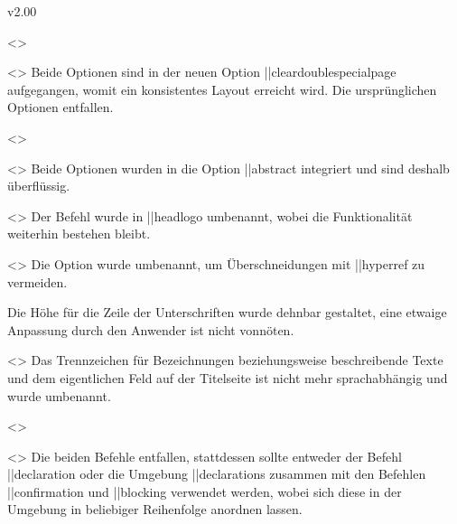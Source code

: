 \begin{Changes}{v2.00}
\begin{Obsolete}
  {}
  <>
\begin{Obsolete}
  {}
  <>
\printdeclarationlist
%
Beide Optionen sind in der neuen Option \Option||{cleardoublespecialpage} 
aufgegangen, womit ein konsistentes Layout erreicht wird. Die ursprünglichen 
Optionen entfallen. 
\end{Obsolete}
\end{Obsolete}

\begin{Obsolete}
  {}
  <>
\begin{Obsolete}
  {}
  <>
\printdeclarationlist
%
Beide Optionen wurden in die Option \Option||{abstract} integriert und sind 
deshalb überflüssig.
\end{Obsolete}
\end{Obsolete}

\begin{Obsolete}
  {}
  <>
\printdeclarationlist
%
Der Befehl wurde in \Macro||{headlogo} umbenannt, wobei die Funktionalität 
weiterhin bestehen bleibt.
\end{Obsolete}

\begin{Obsolete}
  {}
  <>
\printdeclarationlist
%
Die Option wurde umbenannt, um Überschneidungen mit \Package||{hyperref} zu 
vermeiden.
\end{Obsolete}

\begin{Obsolete}
  {}
\printdeclarationlist
%
Die Höhe für die Zeile der Unterschriften wurde dehnbar gestaltet, eine etwaige 
Anpassung durch den Anwender ist nicht vonnöten.
\end{Obsolete}

\begin{Obsolete}
  {}
  <>
\printdeclarationlist
%
Das Trennzeichen für Bezeichnungen beziehungsweise beschreibende Texte und dem 
eigentlichen Feld auf der Titelseite ist nicht mehr sprachabhängig und wurde 
umbenannt.
\end{Obsolete}

\begin{Obsolete}
  {}
  <>
\begin{Obsolete}
  {}
  <>
\printdeclarationlist
%
Die beiden Befehle entfallen, stattdessen sollte entweder der Befehl 
\Macro||{declaration} oder die Umgebung \Environment||{declarations} zusammen 
mit den Befehlen \Macro||{confirmation} und \Macro||{blocking} verwendet 
werden, wobei sich diese in der Umgebung in beliebiger Reihenfolge anordnen 
lassen.
\end{Obsolete}
\end{Obsolete}


\end{Changes}
